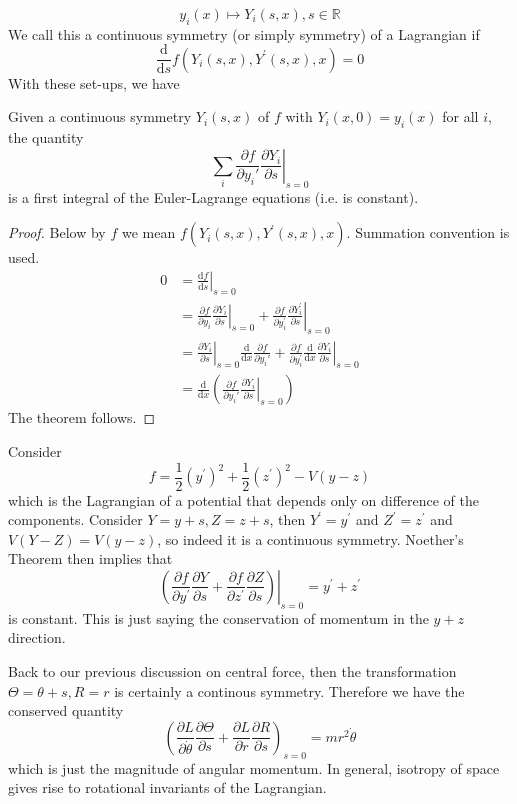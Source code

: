 \documentclass{article}
\begin{document}
$$y_i(x)\mapsto Y_i(s,x),s\in\mathbb R$$
We call this a continuous symmetry (or simply symmetry) of a Lagrangian if
$$\frac{\mathrm d}{\mathrm ds}f(Y_i(s,x),Y^\prime(s,x),x)=0$$
With these set-ups, we have
\begin{theorem}
    Given a continuous symmetry $Y_i(s,x)$ of $f$ with $Y_i(x,0)=y_i(x)$ for all $i$, the quantity
    $$\sum_i\frac{\partial f}{\partial y_i'}\left.\frac{\partial Y_i}{\partial s}\right|_{s=0}$$
    is a first integral of the Euler-Lagrange equations (i.e. is constant).
\end{theorem}
\begin{proof}
    Below by $f$ we mean $f(Y_i(s,x),Y^\prime(s,x),x)$.
    Summation convention is used.
    \begin{align*}
        0&=\left.\frac{\mathrm df}{\mathrm ds}\right|_{s=0}\\
        &=\frac{\partial f}{\partial y_i}\left.\frac{\partial Y_i}{\partial s}\right|_{s=0}+\frac{\partial f}{\partial y_i^\prime}\left.\frac{\partial Y_i^\prime}{\partial s}\right|_{s=0}\\
        &=\left.\frac{\partial Y_i}{\partial s}\right|_{s=0}\frac{\mathrm d}{\mathrm dx}\frac{\partial f}{\partial y_i'}+\frac{\partial f}{\partial y_i^\prime}\left.\frac{\mathrm d}{\mathrm dx}\frac{\partial Y_i}{\partial s}\right|_{s=0}\\
        &=\frac{\mathrm d}{\mathrm dx}\left( \frac{\partial f}{\partial y_i'}\left.\frac{\partial Y_i}{\partial s}\right|_{s=0} \right)
    \end{align*}
    The theorem follows.
\end{proof}
\begin{example}
    Consider
    $$f=\frac{1}{2}(y^\prime)^2+\frac{1}{2}(z^\prime)^2-V(y-z)$$
    which is the Lagrangian of a potential that depends only on difference of the components.
    Consider $Y=y+s, Z=z+s$, then $Y^\prime=y^\prime$ and $Z^\prime=z^\prime$ and $V(Y-Z)=V(y-z)$, so indeed it is a continuous symmetry.
    Noether's Theorem then implies that
    $$\left.\left( \frac{\partial f}{\partial y^\prime}\frac{\partial Y}{\partial s}+\frac{\partial f}{\partial z^\prime}\frac{\partial Z}{\partial s} \right)\right|_{s=0}=y^\prime+z^\prime$$
    is constant.
    This is just saying the conservation of momentum in the $y+z$ direction.
\end{example}
\begin{example}
    Back to our previous discussion on central force, then the transformation $\Theta=\theta+s,R=r$ is certainly a continous symmetry.
    Therefore we have the conserved quantity
    $$\left( \frac{\partial L}{\partial\dot{\theta}}\frac{\partial\Theta}{\partial s}+\frac{\partial L}{\partial\dot{r}}\frac{\partial R}{\partial s} \right)_{s=0}=mr^2\dot{\theta}$$
    which is just the magnitude of angular momentum.
    In general, isotropy of space gives rise to rotational invariants of the Lagrangian.
\end{example}
\end{document}
